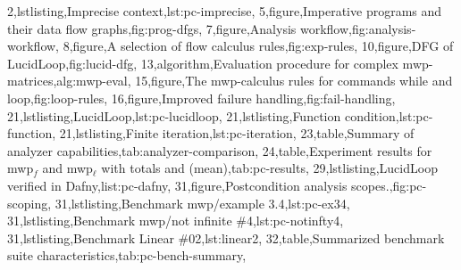 {        2,lstlisting,{Imprecise context},lst:pc-imprecise,
        5,figure,{Imperative programs and their data flow graphs},fig:prog-dfgs,
        7,figure,{Analysis workflow},fig:analysis-workflow,
        8,figure,{A selection of flow calculus rules},fig:exp-rules,
        10,figure,{DFG of LucidLoop},fig:lucid-dfg,
        13,algorithm,{Evaluation procedure for complex mwp-matrices},alg:mwp-eval,
        15,figure,{The mwp-calculus rules for commands while and loop},fig:loop-rules,
        16,figure,{Improved failure handling},fig:fail-handling,
        21,lstlisting,{LucidLoop},lst:pc-lucidloop,
        21,lstlisting,{Function condition},lst:pc-function,
        21,lstlisting,{Finite iteration},lst:pc-iteration,
        23,table,{Summary of analyzer capabilities},tab:analyzer-comparison,
        24,table,{Experiment results for mwp$_f$ and mwp$_\ell$ with totals and (mean)},tab:pc-results,
        29,lstlisting,{LucidLoop verified in Dafny},list:pc-dafny,
        31,figure,{Postcondition analysis scopes.},fig:pc-scoping,
        31,lstlisting,{Benchmark mwp/example 3.4},lst:pc-ex34,
        31,lstlisting,{Benchmark mwp/not infinite \#4},lst:pc-notinfty4,
        31,lstlisting,{Benchmark Linear \#02},lst:linear2,
        32,table,{Summarized benchmark suite characteristics},tab:pc-bench-summary},
